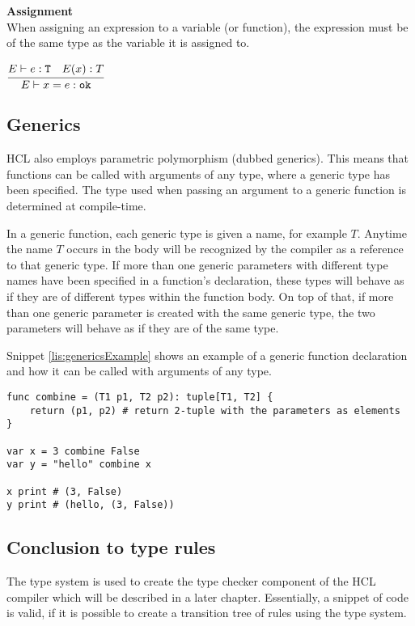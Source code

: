 \textbf{Assignment}\\
When assigning an expression to a variable (or function), the expression must be of the same type as the variable it is assigned to.

\begin{center}
	\begin{math}
	\cfrac
	{E\vdash e : \texttt{T}\quad E(x) : T}
	{E \vdash x = e : \texttt{ok}}
	\end{math}
\end{center}

\subsection{Generics}
HCL also employs parametric polymorphism (dubbed generics).
This means that functions can be called with arguments of any type, where a generic type has been specified.
The type used when passing an argument to a generic function is determined at compile-time.

In a generic function, each generic type is given a name, for example $T$.
Anytime the name $T$ occurs in the body will be recognized by the compiler as a reference to that generic type.
If more than one generic parameters with different type names have been specified in a function's declaration, these types will behave as if they are of different types within the function body.
On top of that, if more than one generic parameter is created with the same generic type, the two parameters will behave as if they are of the same type.

Snippet \ref{lis:genericsExample} shows an example of a generic function declaration and how it can be called with arguments of any type.
\begin{lstlisting}[language=HCL,label=lis:genericsExample,caption=An example of a generic function declaration.]
func combine = (T1 p1, T2 p2): tuple[T1, T2] {
	return (p1, p2) # return 2-tuple with the parameters as elements
}

var x = 3 combine False
var y = "hello" combine x

x print # (3, False)
y print # (hello, (3, False))
\end{lstlisting}

\subsection{Conclusion to type rules}
The type system is used to create the type checker component of the HCL compiler which will be described in a later chapter.
Essentially, a snippet of code is valid, if it is possible to create a transition tree of rules using the type system. 

